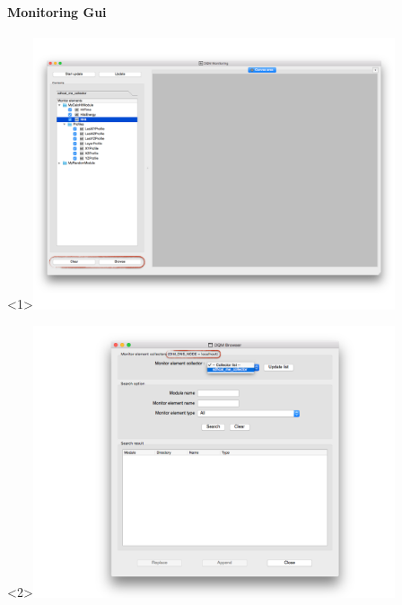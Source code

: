 \documentclass[8pt]{beamer}
\begin{document}
  
 \begin{frame}
    \frametitle{\secname}
    \framesubtitle{ Monitoring Gui }
    
    \begin{overlayarea}{\textwidth}{\textheight}
      \begin{center}
        \begin{onlyenv}<1>\includegraphics[width=0.8\textwidth]{figs/MonitoringGui/MG_Browse.png}\end{onlyenv}
        \begin{onlyenv}<2>\includegraphics[width=0.8\textwidth]{figs/Browser/Browser_DNSNode.png}\end{onlyenv}

\end{center}
\end{overlayarea}
\end{frame}
\end{document}
